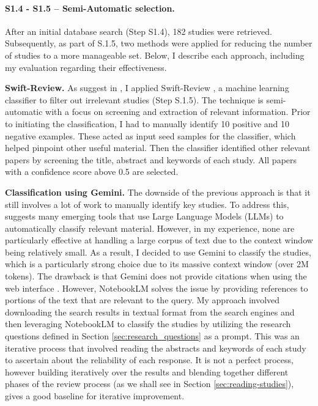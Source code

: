 \paragraph{S1.4 - S1.5 -- Semi-Automatic selection.}
After an initial database search (Step S1.4), 182 studies were retrieved. Subsequently, as part of
S.1.5, two methods were applied for reducing the number of studies to a more manageable set. Below,
I describe each approach, including my evaluation regarding their effectiveness.

\textbf{Swift-Review.}
As suggest in \cite{bolanos_artificial_2024},
I applied Swift-Review \cite{Howard2016SWIFTReviewAT}, a machine learning classifier to filter out
irrelevant studies (Step S.1.5). The technique is semi-automatic
with a focus on screening and extraction of relevant information. Prior to initiating the classification,
I had to manually identify 10 positive and 10 negative examples. These
acted as input seed samples for the classifier, which helped pinpoint other useful material. Then
the classifier identified other relevant papers by screening the title, abstract and keywords of
each study. All papers with a confidence score above 0.5 are selected.

\textbf{Classification using Gemini.}
The downside of the previous approach is that it still involves a lot of work to manually identify key
studies. To address this, \cite{bolanos_artificial_2024} suggests many emerging tools that use Large Language Models (LLMs)
to automatically classify relevant material. However, in my experience, none are particularly effective
at handling a large corpus of text due to the context window being relatively small. As a result, I decided
to use Gemini \cite{team_gemini_2024} to classify the studies, which is a particularly strong choice due to its massive
context window (over 2M tokens). The drawback is that Gemini does not provide citations when using the web interface
\cite{noauthor_gemini_nodate}. However, NotebookLM \cite{notebooklm_google_2024} solves the issue by providing references
to portions of the text that are relevant to the query. My approach involved downloading the search results in textual format from the
search engines and then leveraging NotebookLM to classify the studies by utilizing the research questions
defined in Section \ref{sec:research_questions} as a prompt. This was an iterative process that involved
reading the abstracts and keywords of each study to ascertain about the reliability of each response. It is not a perfect process,
however building iteratively over the results and blending together different phases of the review process
(as we shall see in Section \ref{sec:reading-studies}), gives a good baseline for iterative improvement.

